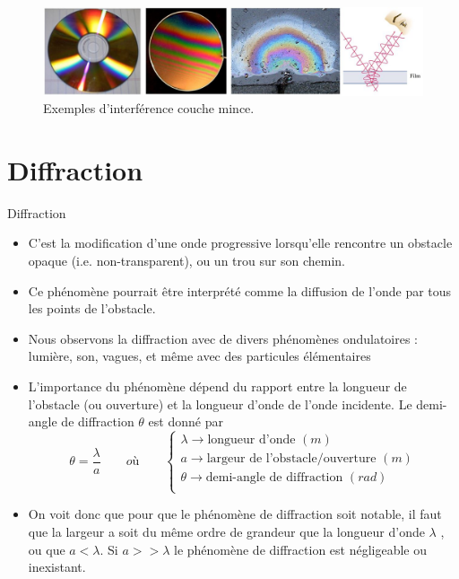 \documentclass[11pt,a4paper]{article}
\begin{document}
\begin{figure}[H]
    \centering
    \includegraphics[width=\linewidth]{imgs/p5/thinfilm.jpg}
    \caption{Exemples d'interférence couche mince.}
\end{figure}

\section{Diffraction}

\begin{defn}{Diffraction}
\begin{itemize}
    \item C’est la modification d’une onde progressive lorsqu’elle rencontre un obstacle opaque (i.e. non-transparent), ou un trou sur son chemin. 
    \item Ce phénomène pourrait être interprété comme la diffusion de l’onde par tous les points de l’obstacle. 
    \item Nous observons la diffraction avec de divers phénomènes ondulatoires : lumière, son, vagues, et même avec des particules élémentaires
    \item L’importance du phénomène dépend du rapport entre la longueur de l’obstacle (ou ouverture) et la longueur d’onde de l’onde incidente. Le demi-angle de diffraction $\theta$ est donné par
    \[        
    \theta = \dfrac{\lambda}{a} \quad \quad  où \quad  \quad 
    \begin{cases}
    \lambda \rightarrow \text{longueur d'onde }(m) \\
    a  \rightarrow \text{largeur de l'obstacle/ouverture  }(m) \\ 
    \theta \rightarrow \text{demi-angle de diffraction }(rad)\\
    \end{cases}
    \]
    \item On voit donc que pour que le phénomène de diffraction soit notable, il faut que la largeur a soit du même ordre de grandeur que la longueur d’onde $\lambda$ , ou que $a<\lambda$.  Si $a>>\lambda$ le phénomène de diffraction est négligeable ou inexistant.  
\end{itemize}
\end{defn}
\end{document}
